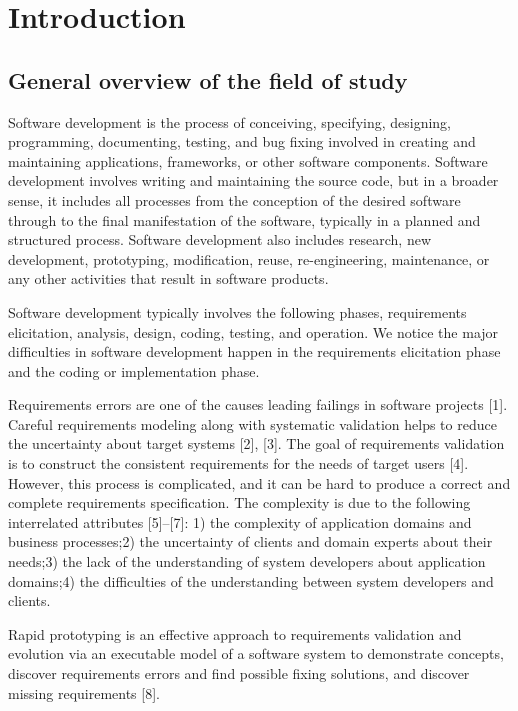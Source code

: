 \chapter{Introduction}



\section{General overview of the field of study}
Software development is the process of conceiving, specifying, designing, programming, documenting, testing, and bug fixing involved in creating and maintaining applications, frameworks, or other software components. 
Software development involves writing and maintaining the source code, but in a broader sense, it includes all processes from the conception of the desired software through to the final manifestation of the software, typically in a planned and structured process. 
Software development also includes research, new development, prototyping, modification, reuse, re-engineering, maintenance, or any other activities that result in software products.

Software development typically involves the following phases, requirements elicitation, analysis, design, coding, testing, and operation. We notice the major difficulties in software development happen in the requirements elicitation phase and the coding or implementation phase.

Requirements errors are one of the causes leading failings in software projects [1]. Careful requirements modeling along with systematic validation helps to reduce the uncertainty about target systems [2], [3]. The goal of requirements validation is to construct the consistent requirements for the needs of target users [4]. However, this process is complicated, and it can be hard to produce a correct and complete requirements specification. The complexity is due to the following interrelated attributes [5]–[7]:
1) the complexity of application domains and business processes;2) the uncertainty of clients and domain experts about their needs;3) the lack of the understanding of system developers about application domains;4) the difficulties of the understanding between system developers and clients. 

Rapid prototyping is an effective approach to requirements validation and evolution via an executable model of a software system to demonstrate concepts, discover requirements errors and find possible fixing solutions, and discover missing requirements [8]. 

